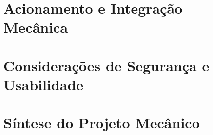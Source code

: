 \section{Acionamento e Integração Mecânica}
\label{sec:acionamento-mecanico}


\section{Considerações de Segurança e Usabilidade}
\label{sec:seguranca-usabilidade-mecanica}


\section{Síntese do Projeto Mecânico}
\label{sec:sintese-mecanica}

